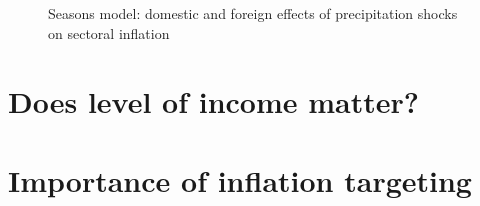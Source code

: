 \documentclass[
  letterpaper,
  DIV=11,
  numbers=noendperiod]{scrartcl}
\begin{document}
\begin{figure}[H]


\caption{\label{fig-seasonal_precip}Seasons model: domestic and foreign
effects of precipitation shocks on sectoral inflation}

\end{figure}%

\section{Does level of income
matter?}\label{does-level-of-income-matter}

\section{Importance of inflation
targeting}\label{importance-of-inflation-targeting}
\end{document}
